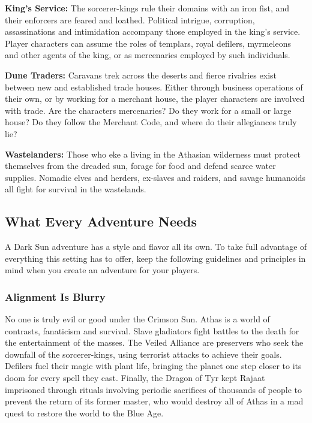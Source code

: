 \textbf{King's Service:} The sorcerer-kings rule their domains with an iron fist, and their enforcers are feared and loathed. Political intrigue, corruption, assassinations and intimidation accompany those employed in the king's service. Player characters can assume the roles of templars, royal defilers, myrmeleons and other agents of the king, or as mercenaries employed by such individuals.

\textbf{Dune Traders:} Caravans trek across the deserts and fierce rivalries exist between new and established trade houses. Either through business operations of their own, or by working for a merchant house, the player characters are involved with trade. Are the characters mercenaries? Do they work for a small or large house? Do they follow the Merchant Code, and where do their allegiances truly lie?

\textbf{Wastelanders:} Those who eke a living in the Athasian wilderness must protect themselves from the dreaded sun, forage for food and defend scarce water supplies. Nomadic elves and herders, ex-slaves and raiders, and savage humanoids all fight for survival in the wastelands.



\subsection{What Every Adventure Needs}
A {\tableheader Dark Sun} adventure has a style and flavor all its own. To take full advantage of everything this setting has to offer, keep the following guidelines and principles in mind when you create an adventure for your players.


\subsubsection{Alignment Is Blurry}
No one is truly evil or good under the Crimson Sun. Athas is a world of contrasts, fanaticism and survival. Slave gladiators fight battles to the death for the entertainment of the masses. The Veiled Alliance are preservers who seek the downfall of the sorcerer-kings, using terrorist attacks to achieve their goals. Defilers fuel their magic with plant life, bringing the planet one step closer to its doom for every spell they cast. Finally, the Dragon of Tyr kept Rajaat imprisoned through rituals involving periodic sacrifices of thousands of people to prevent the return of its former master, who would destroy all of Athas in a mad quest to restore the world to the Blue Age.

